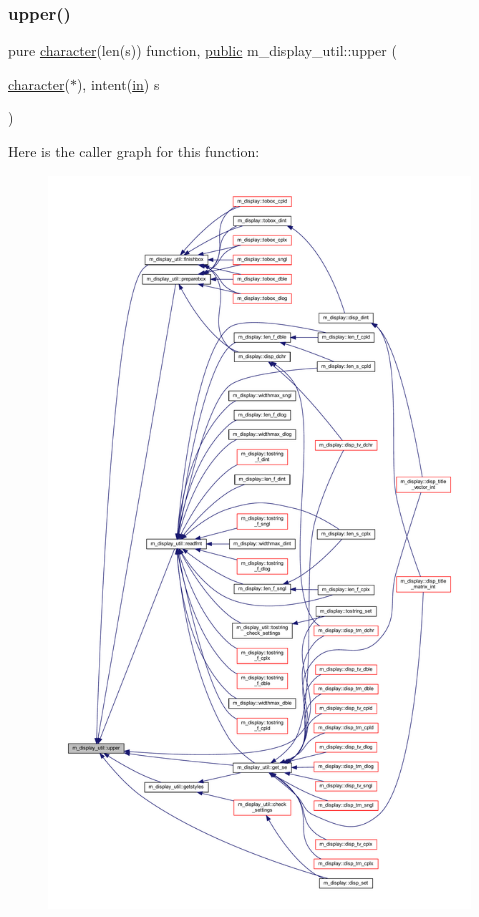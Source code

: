 \subsubsection{\texorpdfstring{upper()}{upper()}}
{\footnotesize\ttfamily pure \hyperlink{option__stopwatch_83_8txt_abd4b21fbbd175834027b5224bfe97e66}{character}(len(s)) function, \hyperlink{M__stopwatch_83_8txt_a2f74811300c361e53b430611a7d1769f}{public} m\+\_\+display\+\_\+util\+::upper (\begin{DoxyParamCaption}\item[{\hyperlink{option__stopwatch_83_8txt_abd4b21fbbd175834027b5224bfe97e66}{character}($\ast$), intent(\hyperlink{M__journal_83_8txt_afce72651d1eed785a2132bee863b2f38}{in})}]{s }\end{DoxyParamCaption})}

Here is the caller graph for this function\+:
\nopagebreak
\begin{figure}[H]
\begin{center}
\leavevmode
\includegraphics[height=550pt]{namespacem__display__util_a6a829115368f9e77c8b35fb1c86ac9c3_icgraph}
\end{center}
\end{figure}


